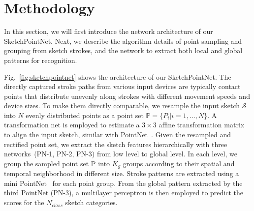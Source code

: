 \section{Methodology}
\label{sec:methodology}


In this section, we will first introduce the network architecture of our SketchPointNet. Next, we describe the algorithm details of point sampling and grouping from sketch strokes, and the network to extract both local and global patterns for recognition.



Fig.~\ref{fig:sketchpointnet} shows the architecture of our SketchPointNet.
%
The directly captured stroke paths from various input devices are typically contact points that distribute unevenly along strokes with different movement speeds and device sizes.
To make them directly comparable, we resample the input sketch $\mathcal{S}$ into $N$ evenly distributed points as a point set $\mathbb{P}=\{P_i|i=1,\ldots,N\}$.
A transformation net is employed to estimate a $3\times3$ affine transformation matrix to align the input sketch, similar with PointNet~\cite{qi2017pointnetplusplus}.
%
Given the resampled and rectified point set, we extract the sketch features hierarchically with three networks~(PN-1, PN-2, PN-3) from low level to global level.
%
In each level, we group the sampled point set $\mathbb{P}$ into $K_g$ groups according to their spatial and temporal neighborhood in different size.
Stroke patterns are extracted using a mini PointNet~\cite{qi2017pointnetplusplus} for each point group.
%
From the global pattern extracted by the third PointNet (PN-3), a multilayer perceptron is then employed to predict the scores for the $N_{class}$ sketch categories.



